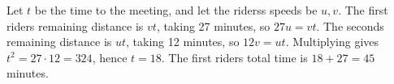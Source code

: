 Let $t$ be the time to the meeting, and let the riders\textquotesingle s speeds be $u,v$. The first rider\textquotesingle s remaining distance is $vt$, taking 27 minutes, so $27u=vt$. The second\textquotesingle s remaining distance is $ut$, taking 12 minutes, so $12v=ut$. Multiplying gives $t^2=27\cdot12=324$, hence $t=18$. The first rider\textquotesingle s total time is $18+27=\boxed{45}$ minutes.

